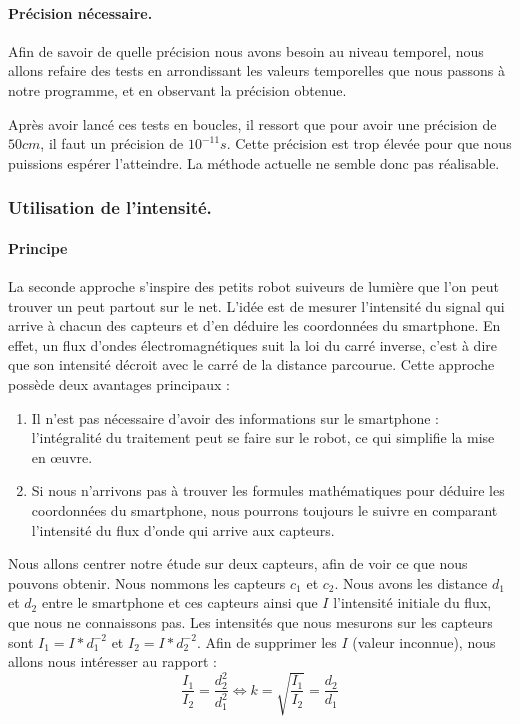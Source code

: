 \documentclass{article}
\begin{document}
\paragraph{Précision nécessaire.}
Afin de savoir de quelle précision nous avons besoin au niveau temporel, nous allons refaire des tests en arrondissant les valeurs temporelles que nous passons à notre programme, et en observant la précision obtenue.

Après avoir lancé ces tests en boucles, il ressort que pour avoir une précision de $50cm$, il faut un précision de $10^{-11}s$. Cette précision est trop élevée pour que nous puissions espérer l'atteindre. La méthode actuelle ne semble donc pas réalisable.

\subsubsection{Utilisation de l'intensité.}
\paragraph{Principe} La seconde approche s'inspire des petits robot suiveurs de lumière que l'on peut trouver un peut partout sur le net. L'idée est de mesurer l'intensité du signal qui arrive à chacun des capteurs et d'en déduire les coordonnées du smartphone. En effet, un flux d'ondes électromagnétiques suit la loi du carré inverse, c'est à dire que son intensité décroit avec le carré de la distance parcourue. Cette approche possède deux avantages principaux : \begin{enumerate}
    \item Il n'est pas nécessaire d'avoir des informations sur le smartphone : l'intégralité du traitement peut se faire sur le robot, ce qui simplifie la mise en œuvre.
    \item Si nous n'arrivons pas à trouver les formules mathématiques pour déduire les coordonnées du smartphone, nous pourrons toujours le suivre en comparant l'intensité du flux d'onde qui arrive aux capteurs.
\end{enumerate}

Nous allons centrer notre étude sur deux capteurs, afin de voir ce que nous pouvons obtenir. Nous nommons les capteurs $c_1$ et $c_2$. Nous avons les distance $d_1$ et $d_2$ entre le smartphone et ces capteurs ainsi que $I$ l'intensité initiale du flux, que nous ne connaissons pas. Les intensités que nous mesurons sur les capteurs sont $I_1=I*d_1^{-2}$ et $I_2=I*d_2^{-2}$. Afin de supprimer les $I$ (valeur inconnue), nous allons nous intéresser au rapport :
\[ \frac{I_1}{I_2} = \frac{d_2^2}{d_1^2} \Leftrightarrow k=\sqrt{\frac{I_1}{I_2}}=\frac{d_2}{d_1} \]
\end{document}
